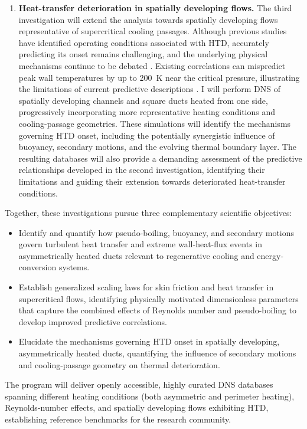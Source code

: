 \documentclass[11pt]{article}
\begin{document}
\begin{enumerate}
	\item \textbf{Heat-transfer deterioration in spatially developing flows.}
	The third investigation will extend the analysis towards spatially developing flows representative of supercritical cooling passages.
	Although previous studies have identified operating conditions associated with HTD, accurately predicting its onset remains challenging, and the underlying physical mechanisms continue to be debated \cite{Nasuti2021,Li2025}.
	Existing correlations can mispredict peak wall temperatures by up to 200~K near the critical pressure, illustrating the limitations of current predictive descriptions \cite{Nasuti2021}.
	I will perform DNS of spatially developing channels and square ducts heated from one side, progressively incorporating more representative heating conditions and cooling-passage geometries.
	These simulations will identify the mechanisms governing HTD onset, including the potentially synergistic influence of buoyancy, secondary motions, and the evolving thermal boundary layer.
	The resulting databases will also provide a demanding assessment of the predictive relationships developed in the second investigation, identifying their limitations and guiding their extension towards deteriorated heat-transfer conditions.
\end{enumerate}
Together, these investigations pursue three complementary scientific objectives:
\begin{itemize}
	\item[\textbf{O1.}] Identify and quantify how pseudo-boiling, buoyancy, and secondary motions govern turbulent heat transfer and extreme wall-heat-flux events in asymmetrically heated ducts relevant to regenerative cooling and energy-conversion systems.
	
	\item[\textbf{O2.}] Establish generalized scaling laws for skin friction and heat transfer in supercritical flows, identifying physically motivated dimensionless parameters that capture the combined effects of Reynolds number and pseudo-boiling to develop improved predictive correlations.
	
	\item[\textbf{O3.}] Elucidate the mechanisms governing HTD onset in spatially developing, asymmetrically heated ducts, quantifying the influence of secondary motions and cooling-passage geometry on thermal deterioration.
\end{itemize}
The program will deliver openly accessible, highly curated DNS databases spanning different heating conditions (both asymmetric and perimeter heating), Reynolds-number effects, and spatially developing flows exhibiting HTD, establishing reference benchmarks for the research community.
\end{document}
